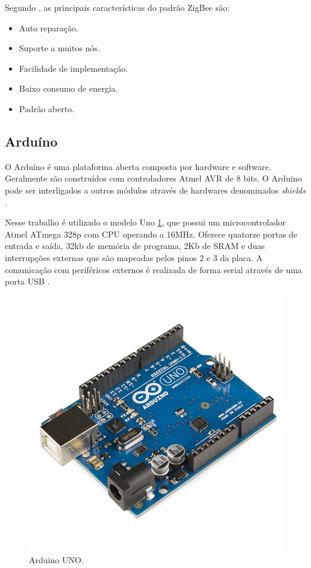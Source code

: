 Segundo \cite{Ramya:2011}, as principais características do padrão ZigBee são:


\begin{itemize}
  \item Auto reparação.
  \item Suporte a muitos nós.
  \item Facilidade de implementação.
  \item Baixo consumo de energia.
  \item Padrão aberto.
\end{itemize}

\subsection{Arduíno}

O Arduíno é uma plataforma aberta composta por hardware e software. Geralmente são construídos com controladores Atmel AVR de 8 bits. O Arduino pode ser interligados a outros módulos através de hardwares denominados \emph{shields} \cite{Arduino:2015}.

Nesse trabalho é utilizado o modelo Uno \ref{fig:arduinoUno}, que possui um microcontrolador Atmel ATmega 328p com CPU operando a 16MHz. Oferece quatorze portas de entrada e saída, 32kb de memória de programa, 2Kb de SRAM e duas interrupções externas que são mapeadas pelos pinos 2 e 3 da placa. A comunicação com periféricos externos é realizada de forma serial através de uma porta USB \cite{Arduino:2015}.

\begin{figure}[htbp]
	\centering
		\includegraphics[scale=0.2]{referencial/figuras/arduinoUno.jpg}
	\caption{Arduino UNO.}
	\label{fig:arduinoUno}
\end{figure}


